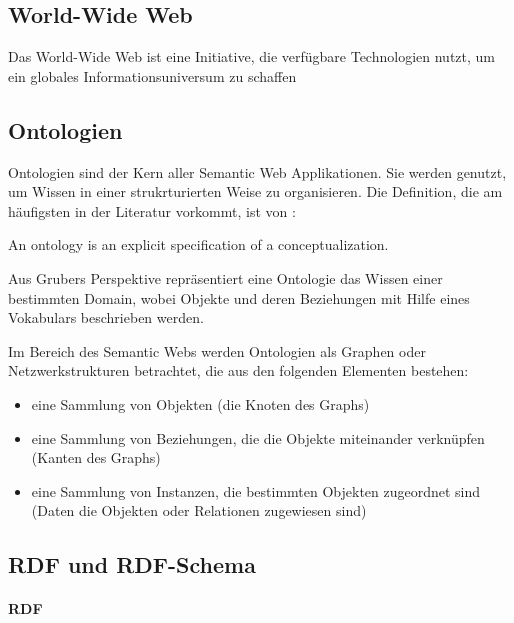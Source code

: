 \subsection{World-Wide Web}

Das World-Wide Web ist eine Initiative, die verfügbare Technologien nutzt, um ein globales Informationsuniversum zu schaffen

\subsection{Ontologien}

Ontologien sind der Kern aller Semantic Web Applikationen. 
Sie werden genutzt, um Wissen in einer strukrturierten Weise zu organisieren.
Die Definition, die am häufigsten in der Literatur vorkommt, ist von \citet{gruber_translation_1993}:

\begin{definition}
  An ontology is an explicit specification of a conceptualization.
\end{definition}

\noindent Aus Grubers Perspektive repräsentiert eine Ontologie das Wissen einer bestimmten Domain, wobei Objekte und deren Beziehungen mit Hilfe eines Vokabulars beschrieben werden. \citep[vgl.]{breitman_semantic_2007}

Im Bereich des Semantic Webs werden Ontologien als Graphen oder Netzwerkstrukturen betrachtet, die aus den folgenden Elementen bestehen:

\begin{itemize}
	\item eine Sammlung von Objekten (die Knoten des Graphs)
	\item eine Sammlung von Beziehungen, die die Objekte miteinander verknüpfen (Kanten des Graphs)
	\item eine Sammlung von Instanzen, die bestimmten Objekten zugeordnet sind (Daten die Objekten oder Relationen zugewiesen sind) \citep[vgl.]{davies_semantic_2006}
\end{itemize}

\subsection{RDF und RDF-Schema} 

\paragraph{RDF}

